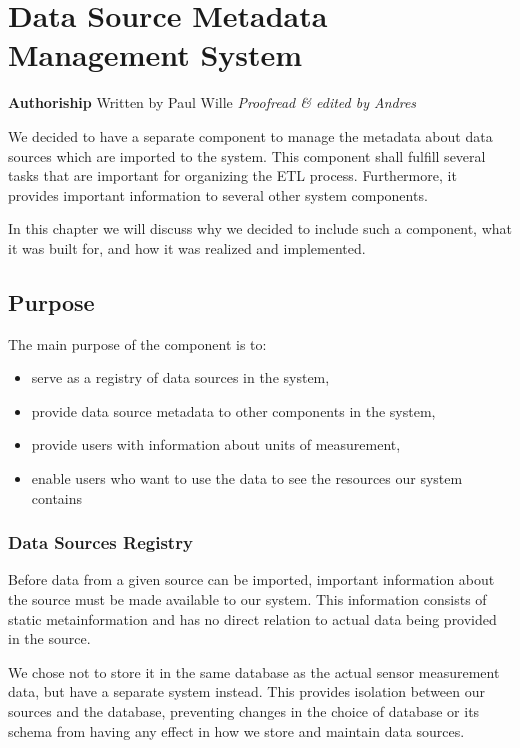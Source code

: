 \section{Data Source Metadata Management
System}\label{data-source-metadata-management-system}

\textbf{Authoriship} Written by Paul Wille \emph{Proofread \& edited by
Andres}

We decided to have a separate component to manage the metadata about
data sources which are imported to the system. This component shall
fulfill several tasks that are important for organizing the ETL process.
Furthermore, it provides important information to several other system
components.

In this chapter we will discuss why we decided to include such a
component, what it was built for, and how it was realized and
implemented.

\subsection{Purpose}\label{purpose}

The main purpose of the component is to:

\begin{itemize}
\tightlist
\item
  serve as a registry of data sources in the system,
\item
  provide data source metadata to other components in the system,
\item
  provide users with information about units of measurement,
\item
  enable users who want to use the data to see the resources our system
  contains
\end{itemize}

\subsubsection{Data Sources Registry}\label{data-sources-registry}

Before data from a given source can be imported, important information
about the source must be made available to our system. This information
consists of static metainformation and has no direct relation to actual
data being provided in the source.

We chose not to store it in the same database as the actual sensor
measurement data, but have a separate system instead. This provides
isolation between our sources and the database, preventing changes in
the choice of database or its schema from having any effect in how we
store and maintain data sources.

